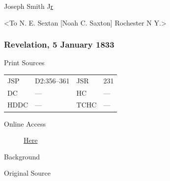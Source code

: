 				\begin{tightright}
				Joseph Smith J\uline{r}
				\end{tightright}
				
				<To N. E. Sextan [Noah C. Saxton] Rochester N Y.>
				
		\subsubsection{Revelation, 5 January 1833}
			\label{EMS-1833-JS-5-JAN-1833}
		
			\begin{description}
				\item[Print Sources]
			\end{description}

				\begin{tabular}{p{0.5in}p{1in}p{0.5in}p{1in}}
				JSP	 	& D2:356--361		& JSR 		& 231 \\
				DC	 	& --- 				& HC 		& --- \\
				HDDC 	& ---				& TCHC 		& --- \\
				\end{tabular}
			
			\begin{description}
				\item[Online Access] \href{https://www.josephsmithpapers.org/paper-summary/revelation-5-january-1833/1}{Here}
			\end{description}
			
			\begin{description}
				\item[Background]
			\end{description}
			
			
			\begin{description}
				\item[Original Source]
			\end{description}
			
			
